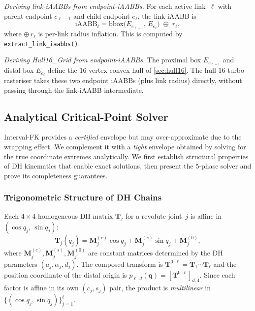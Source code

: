 \documentclass[journal]{IEEEtran}
\newcommand{\iAABB}{\text{iAABB}}
\newcommand{\bT}{\mathbf{T}}
\begin{document}
\emph{Deriving link-iAABBs from endpoint-iAABBs.}
For each active link~$\ell$ with parent endpoint $e_{\ell-1}$
and child endpoint $e_\ell$, the link-iAABB is
\begin{equation}
  \iAABB_\ell = \mathrm{bbox}\bigl(E_{e_{\ell-1}},\, E_{e_\ell}\bigr)
  \;\oplus\; r_\ell,
\end{equation}
where $\oplus\,r_\ell$ is per-link radius inflation.
This is computed by \texttt{extract\_link\_iaabbs()}.

\emph{Deriving Hull16\_Grid from endpoint-iAABBs.}
The proximal box $E_{e_{\ell-1}}$ and distal box $E_{e_\ell}$
define the 16-vertex convex hull of \cref{sec:hull16}.
The hull-16 turbo rasteriser takes these two endpoint iAABBs
(plus link radius) directly, without passing through the
link-iAABB intermediate.

\subsection{Analytical Critical-Point Solver}\label{sec:critical}

Interval-FK provides a \emph{certified} envelope but may over-approximate
due to the wrapping effect.
We complement it with a \emph{tight} envelope obtained by solving for
the true coordinate extremes analytically.
We first establish structural properties of DH kinematics that
enable exact solutions, then present the 5-phase solver and prove
its completeness guarantees.


\subsubsection{Trigonometric Structure of DH Chains}\label{sec:critical_structure}

Each $4{\times}4$ homogeneous DH matrix $\bT_j$ for a revolute joint~$j$
is affine in $(\cos q_j,\,\sin q_j)$:
\begin{equation}\label{eq:dh_affine}
  \bT_j(q_j)
  = \bm{M}_j^{(c)}\cos q_j
  + \bm{M}_j^{(s)}\sin q_j
  + \bm{M}_j^{(0)},
\end{equation}
where $\bm{M}_j^{(c)}, \bm{M}_j^{(s)}, \bm{M}_j^{(0)}$ are constant
matrices determined by the DH parameters $(a_j,\alpha_j,d_j)$.
The composed transform is
$\bT^{0:\ell} = \bT_1 \cdots \bT_\ell$
and the position coordinate of the distal origin is
$p_{\ell,d}(\bm{q}) = [\bT^{0:\ell}]_{d,4}$.
Since each factor is affine in its own $(c_j,s_j)$ pair,
the product is \emph{multilinear} in
$\{(\cos q_j,\sin q_j)\}_{j=1}^\ell$.
\end{document}
